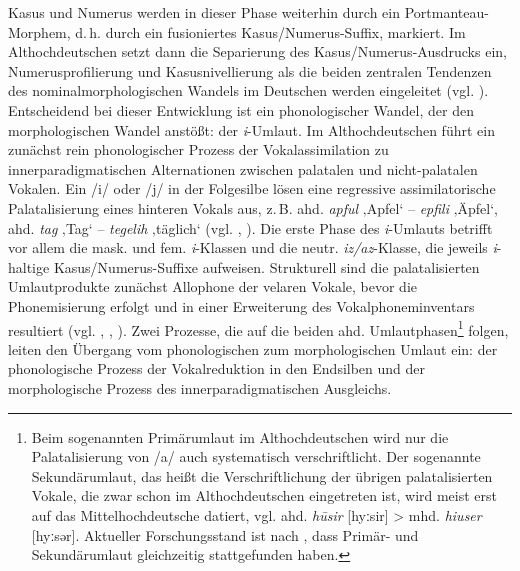 Kasus und Numerus werden in dieser Phase weiterhin durch ein Portmanteau-Morphem, d.\,h. durch ein fusioniertes Kasus/Numerus-Suffix, markiert. Im Althochdeutschen setzt dann die Separierung des Kasus/Numerus-Ausdrucks ein, Numerusprofilierung und Kasusnivellierung als die beiden zentralen Tendenzen des nominalmorphologischen Wandels im Deutschen werden eingeleitet (vgl. \citealt[§192a]{BrauneHeidermanns2018}). Entscheidend bei dieser Entwicklung ist ein phonologischer Wandel, der den morphologischen Wandel anstößt: der \textit{i}-Umlaut. Im Althochdeutschen führt ein zunächst rein phonologischer Prozess der Vokalassimilation zu innerparadigmatischen Alternationen zwischen palatalen und nicht-palatalen Vokalen. Ein /i/ oder /j/ in der Folgesilbe lösen eine regressive assimilatorische Palatalisierung eines hinteren Vokals aus, z.\,B. ahd. \textit{apful} ‚Apfel‘ -- \textit{epfili} ‚Äpfel‘, ahd. \textit{tag} ‚Tag‘ -- \textit{tegelih} ‚täglich‘ (vgl. \citealt[§51]{BrauneHeidermanns2018}, \citealt[229]{Wiese1987}). Die erste Phase des \textit{i}{}-Umlauts betrifft vor allem die mask. und fem. \textit{i}{}-Klassen und die neutr. \textit{iz/az}{}-Klasse, die jeweils \textit{i}{}-haltige Kasus/Numerus-Suffixe aufweisen. Strukturell sind die palatalisierten Umlautprodukte zunächst Allophone der velaren Vokale, bevor die Phonemisierung erfolgt und in einer Erweiterung des Vokalphoneminventars resultiert (vgl. \citealt[195]{Ronneberger-Sibold1990}, \citealt[120--123]{Schulze2016}, \citealt[306]{Sonderegger1979}). Zwei Prozesse, die auf die beiden ahd. Umlautphasen\footnote{Beim sogenannten Primär\-umlaut im Althochdeutschen wird nur die Palatalisierung von /a/ auch systematisch verschriftlicht. Der sogenannte Sekundär\-umlaut, das heißt die Verschriftlichung der übrigen palatalisierten Vokale, die zwar schon im Althochdeutschen eingetreten ist, wird meist erst auf das Mittelhochdeutsche datiert, vgl. ahd. \textit{hūsir} [hyːsir] > mhd. \textit{hiuser} [hyːsər]. Aktueller Forschungsstand ist nach \citet[16]{Nübling2013}, dass Primär- und Sekundär\-umlaut gleichzeitig stattgefunden haben.} folgen, leiten den Übergang vom phonologischen zum morphologischen Umlaut ein: der phonologische Prozess der Vokalreduktion in den Endsilben und der morphologische Prozess des innerparadigmatischen Ausgleichs.

